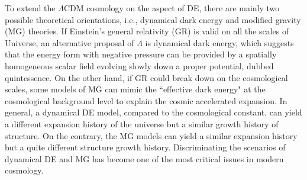 \documentclass[aps,prd,nofootinbib,amsmath,amssymb,superscriptaddress,twocolumn,10pt]{revtex4}%
\begin{document}
To extend the $\Lambda$CDM cosmology on the aspect of DE, there are mainly two possible theoretical orientations, i.e., dynamical dark energy and modified gravity (MG) theories. If Einstein's general relativity (GR) is valid on all the scales of Universe, an alternative proposal of $\Lambda$ is dynamical dark energy, which suggests that the energy form with negative pressure can be provided by a spatially homogeneous scalar field evolving slowly down a proper potential, dubbed quintessence. On the other hand, if GR could break down on the cosmological scales, some models of MG can mimic the ``effective dark energy" at the cosmological background level to explain the cosmic accelerated expansion. In general, a dynamical DE model, compared to the cosmological constant, can yield a different expansion history of the universe but a similar growth history of structure. On the contrary, the MG models can yield a similar expansion history but a quite different structure growth history. Discriminating the scenarios of dynamical DE and MG has become one of the most critical issues in modern cosmology.
\end{document}
